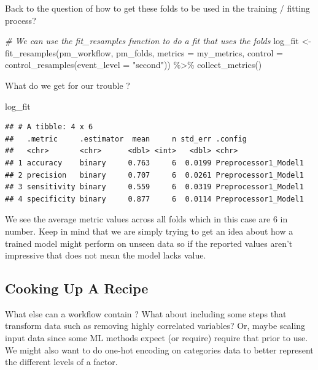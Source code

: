 \documentclass[
]{article}
\newenvironment{Shaded}{\begin{snugshade}}{\end{snugshade}}
\newcommand{\AttributeTok}[1]{\textcolor[rgb]{0.77,0.63,0.00}{#1}}
\newcommand{\CommentTok}[1]{\textcolor[rgb]{0.56,0.35,0.01}{\textit{#1}}}
\newcommand{\FunctionTok}[1]{\textcolor[rgb]{0.00,0.00,0.00}{#1}}
\newcommand{\NormalTok}[1]{#1}
\newcommand{\OtherTok}[1]{\textcolor[rgb]{0.56,0.35,0.01}{#1}}
\newcommand{\SpecialCharTok}[1]{\textcolor[rgb]{0.00,0.00,0.00}{#1}}
\newcommand{\StringTok}[1]{\textcolor[rgb]{0.31,0.60,0.02}{#1}}
\begin{document}
Back to the question of how to get these folds to be used in the
training / fitting process?

\begin{Shaded}
\begin{Highlighting}[]
\CommentTok{\# We can use the fit\_resamples function to do a fit that uses the folds}
\NormalTok{log\_fit }\OtherTok{\textless{}{-}} \FunctionTok{fit\_resamples}\NormalTok{(pm\_workflow, }
\NormalTok{                         pm\_folds, }
                         \AttributeTok{metrics =}\NormalTok{ my\_metrics,}
                         \AttributeTok{control =} \FunctionTok{control\_resamples}\NormalTok{(}\AttributeTok{event\_level =} \StringTok{"second"}\NormalTok{)) }\SpecialCharTok{\%\textgreater{}\%}
  \FunctionTok{collect\_metrics}\NormalTok{()}
\end{Highlighting}
\end{Shaded}

What do we get for our trouble ?

\begin{Shaded}
\begin{Highlighting}[]
\NormalTok{log\_fit}
\end{Highlighting}
\end{Shaded}

\begin{verbatim}
## # A tibble: 4 x 6
##   .metric     .estimator  mean     n std_err .config             
##   <chr>       <chr>      <dbl> <int>   <dbl> <chr>               
## 1 accuracy    binary     0.763     6  0.0199 Preprocessor1_Model1
## 2 precision   binary     0.707     6  0.0261 Preprocessor1_Model1
## 3 sensitivity binary     0.559     6  0.0319 Preprocessor1_Model1
## 4 specificity binary     0.877     6  0.0114 Preprocessor1_Model1
\end{verbatim}

We see the average metric values across all folds which in this case are
6 in number. Keep in mind that we are simply trying to get an idea about
how a trained model might perform on unseen data so if the reported
values aren't impressive that does not mean the model lacks value.

\hypertarget{cooking-up-a-recipe}{%
\subsection{Cooking Up A Recipe}\label{cooking-up-a-recipe}}

What else can a workflow contain ? What about including some steps that
transform data such as removing highly correlated variables? Or, maybe
scaling input data since some ML methods expect (or require) require
that prior to use. We might also want to do one-hot encoding on
categories data to better represent the different levels of a factor.
\end{document}
